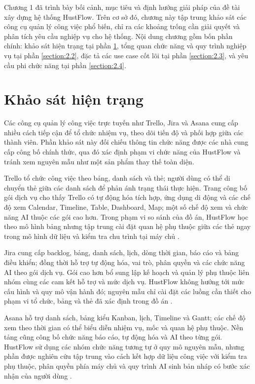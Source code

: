 \documentclass[../DoAn.tex]{subfiles}
\begin{document}
Chương 1 đã trình bày bối cảnh, mục tiêu và định hướng giải pháp của đề tài xây dựng hệ thống HustFlow. Trên cơ sở đó, chương này tập trung khảo sát các công cụ quản lý công việc phổ biến, chỉ ra các khoảng trống cần giải quyết và phân tích yêu cầu nghiệp vụ cho hệ thống. Nội dung chương gồm bốn phần chính: khảo sát hiện trạng tại phần \ref{section:2.1}, tổng quan chức năng và quy trình nghiệp vụ tại phần \ref{section:2.2}, đặc tả các use case cốt lõi tại phần \ref{section:2.3}, và yêu cầu phi chức năng tại phần \ref{section:2.4}.

\section{Khảo sát hiện trạng}
\label{section:2.1}

Các công cụ quản lý công việc trực tuyến như Trello, Jira và Asana cung cấp nhiều cách tiếp cận để tổ chức nhiệm vụ, theo dõi tiến độ và phối hợp giữa các thành viên. Phần khảo sát này đối chiếu thông tin chức năng được các nhà cung cấp công bố chính thức, qua đó xác định phạm vi chức năng của HustFlow và tránh xem nguyên mẫu như một sản phẩm thay thế toàn diện.

Trello tổ chức công việc theo bảng, danh sách và thẻ; người dùng có thể di chuyển thẻ giữa các danh sách để phản ánh trạng thái thực hiện. Trang công bố gói dịch vụ cho thấy Trello có tự động hóa tích hợp, ứng dụng di động và các chế độ xem Calendar, Timeline, Table, Dashboard, Map; một số chế độ xem và chức năng AI thuộc các gói cao hơn. Trong phạm vi so sánh của đồ án, HustFlow học theo mô hình bảng nhưng tập trung cài đặt quan hệ phụ thuộc giữa các thẻ ngay trong mô hình dữ liệu và kiểm tra chu trình tại máy chủ \cite{trelloofficial}.

Jira cung cấp backlog, bảng, danh sách, lịch, dòng thời gian, báo cáo và bảng điều khiển; đồng thời hỗ trợ tự động hóa, vai trò, phân quyền và các chức năng AI theo gói dịch vụ. Gói cao hơn bổ sung lập kế hoạch và quản lý phụ thuộc liên nhóm cùng các cam kết hỗ trợ và mức dịch vụ. HustFlow không hướng tới mức cấu hình và quy mô vận hành đó; nguyên mẫu chỉ cài đặt các luồng cần thiết cho phạm vi tổ chức, bảng và thẻ đã xác định trong đồ án \cite{jiraofficial}.

Asana hỗ trợ danh sách, bảng kiểu Kanban, lịch, Timeline và Gantt; các chế độ xem theo thời gian có thể biểu diễn nhiệm vụ, mốc và quan hệ phụ thuộc. Nền tảng cũng công bố chức năng báo cáo, tự động hóa và AI theo từng gói. HustFlow sử dụng các nhóm chức năng tương tự ở quy mô nguyên mẫu, nhưng phần được nghiên cứu tập trung vào cách kết hợp dữ liệu công việc với kiểm tra phụ thuộc, phân quyền phía máy chủ và quy trình AI sinh bản nháp có bước xác nhận của người dùng \cite{asanaofficial}.
\end{document}
